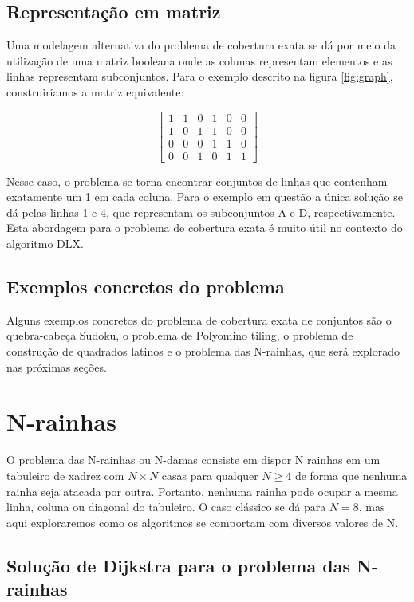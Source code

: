 \documentclass{article}
\begin{document}
\subsection{Representação em matriz} \label{sec:matrixrepresentation}

Uma modelagem alternativa do problema de cobertura exata se dá por meio da utilização 
de uma matriz booleana onde as colunas representam elementos e as linhas representam subconjuntos. Para o exemplo
descrito na figura \ref{fig:graph}, construiríamos a matriz equivalente:

\[
\begin{bmatrix}
    1 & 1 & 0 & 1 & 0 & 0 \\
    1 & 0 & 1 & 1 & 0 & 0 \\
    0 & 0 & 0 & 1 & 1 & 0 \\
    0 & 0 & 1 & 0 & 1 & 1
\end{bmatrix}
\]

Nesse caso, o problema se torna encontrar conjuntos de linhas que contenham exatamente um 1 em cada coluna. Para
o exemplo em questão a única solução se dá pelas linhas 1 e 4, que representam os subconjuntos A e D, respectivamente.
Esta abordagem para o problema de cobertura exata é muito útil no contexto do algoritmo DLX.

\subsection{Exemplos concretos do problema}

Alguns exemplos concretos do problema de cobertura exata de conjuntos são o quebra-cabeça Sudoku,
o problema de Polyomino tiling, o problema de construção de quadrados latinos e o problema das
N-rainhas, que será explorado nas próximas seções.

\section{N-rainhas}

O problema das N-rainhas ou N-damas consiste em dispor N rainhas em um tabuleiro de xadrez com $N \times N$ casas para qualquer
$ N \geq 4 $ de forma que nenhuma rainha seja atacada por outra. Portanto, nenhuma rainha pode ocupar a mesma linha, coluna ou diagonal
do tabuleiro. O caso clássico se dá para $ N = 8 $, mas aqui exploraremos como os algoritmos se comportam com diversos valores de N. 

\subsection{Solução de Dijkstra para o problema das N-rainhas}
\end{document}
